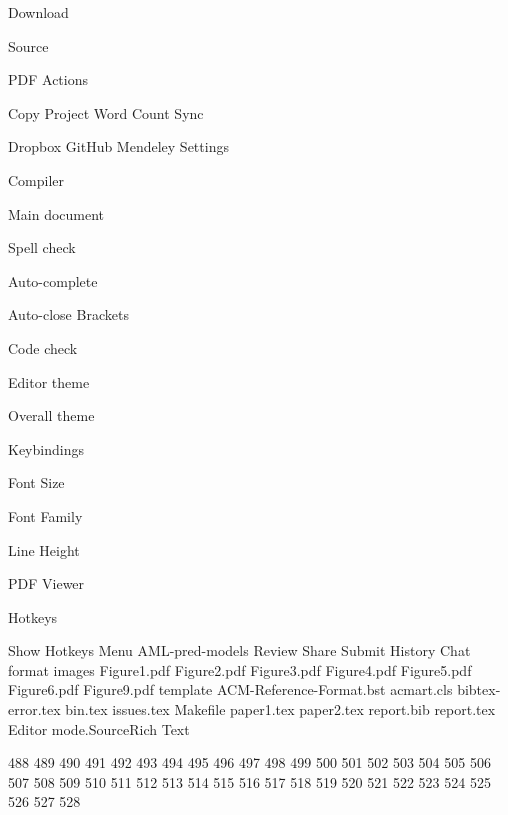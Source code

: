 Download


Source

PDF
Actions

   Copy Project
   Word Count
Sync

   Dropbox
   GitHub
   Mendeley
Settings

Compiler

Main document

Spell check

Auto-complete

Auto-close Brackets

Code check

Editor theme

Overall theme

Keybindings

Font Size

Font Family

Line Height

PDF Viewer

Hotkeys

   Show Hotkeys
Menu
AML-pred-models
Review
Share
Submit
History
Chat
 format
 images
 Figure1.pdf
 Figure2.pdf
 Figure3.pdf
 Figure4.pdf
 Figure5.pdf
 Figure6.pdf
 Figure9.pdf
 template
 ACM-Reference-Format.bst
 acmart.cls
 bibtex-error.tex
 bin.tex
 issues.tex
 Makefile
 paper1.tex
 paper2.tex
 report.bib
 report.tex
Editor mode.SourceRich Text

488
489
490
491
492
493
494
495
496
497
498
499
500
501
502
503
504
505
506
507
508
509
510
511
512
513
514
515
516
517
518
519
520
521
522
523
524
525
526
527
528
